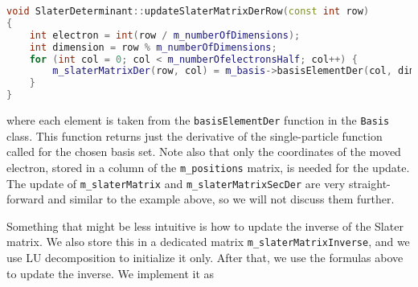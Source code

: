 \begin{lstlisting}[language={c++}]
void SlaterDeterminant::updateSlaterMatrixDerRow(const int row)
{
	int electron = int(row / m_numberOfDimensions);
	int dimension = row % m_numberOfDimensions;
	for (int col = 0; col < m_numberOfelectronsHalf; col++) {
		m_slaterMatrixDer(row, col) = m_basis->basisElementDer(col, dimension, m_positions.col(electron));
	}
}
\end{lstlisting}
where each element is taken from the \lstinline{basisElementDer} function in the \lstinline{Basis} class. This function returns just the derivative of the single-particle function called for the chosen basis set. Note also that only the coordinates of the moved electron, stored in a column of the \lstinline{m_positions} matrix, is needed for the update. The update of \lstinline{m_slaterMatrix} and \lstinline{m_slaterMatrixSecDer} are very straight-forward and similar to the example above, so we will not discuss them further.

Something that might be less intuitive is how to update the inverse of the Slater matrix. We also store this in a dedicated matrix \lstinline{m_slaterMatrixInverse}, and we use LU decomposition to initialize it only. After that, we use the formulas above to update the inverse. We implement it as

